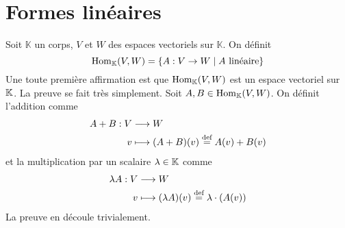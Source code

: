 \let\phi\varphi

\chapter{Formes linéaires}
Soit $\mathbb{K}$ un corps, $V$ et $W$ des espaces vectoriels sur $\mathbb{K}$. On définit
$$\mathrm{Hom}_{\mathbb{K}}(V, W) = \left\{ A : V \rightarrow W \mid A \text{ linéaire} \right\}$$
Une toute première affirmation est que $\mathrm{Hom}_{\mathbb{K}}(V, W)$ est un espace vectoriel sur $\mathbb{K}$. La preuve se fait très simplement. Soit $A, B \in \mathrm{Hom}_{\mathbb{K}}(V, W)$. On définit l'addition comme
\begin{align*}
  A+B: V &\longrightarrow W \\
  v &\longmapsto (A+B)(v) \stackrel{\text{def}}{=} A(v) + B(v)
\end{align*}
et la multiplication par un scalaire $\lambda \in \mathbb{K}$ comme
\begin{align*}
  \lambda A: V &\longrightarrow W \\
  v &\longmapsto (\lambda A)(v) \stackrel{\text{def}}{=} \lambda \cdot (A(v))
\end{align*}
La preuve en découle trivialement.


